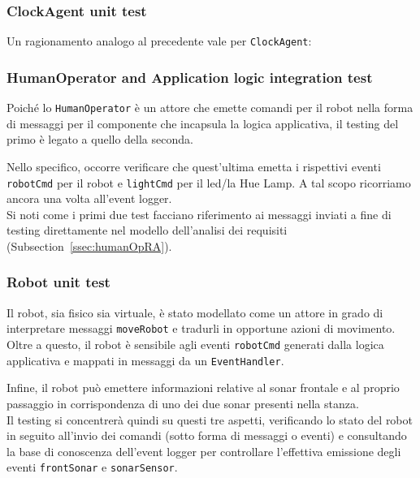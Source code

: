 \documentclass{../llncs}
\newcommand{\codescript}[1]{{\mbox{\small{\texttt{#1}}}}\xspace}
\newcommand{\xss}[1]{\subsectionname~\ref{ssec:#1}}
\newcommand{\subsectionname}{Subsection}
\begin{document}
\subsubsection{ClockAgent unit test}
Un ragionamento analogo al precedente vale per \codescript{ClockAgent}:\\



\subsubsection{HumanOperator and Application logic integration test}
Poiché lo \codescript{HumanOperator} è un attore che emette comandi per il robot nella forma di messaggi per il componente che incapsula la logica applicativa, il testing del primo è legato a quello della seconda.

Nello specifico, occorre verificare che quest'ultima emetta i rispettivi eventi \codescript{robotCmd} per il robot e \codescript{lightCmd} per il led/la Hue Lamp. A tal scopo ricorriamo ancora una volta all'event logger.\\



Si noti come i primi due test facciano riferimento ai messaggi inviati a fine di testing direttamente nel modello dell'analisi dei requisiti (\xss{humanOpRA}).

\subsubsection{Robot unit test}
Il robot, sia fisico sia virtuale, è stato modellato come un attore in grado di interpretare messaggi \codescript{moveRobot} e tradurli in opportune azioni di movimento. Oltre a questo, il robot è sensibile agli eventi \codescript{robotCmd} generati dalla logica applicativa e mappati in messaggi da un \codescript{EventHandler}.

Infine, il robot può emettere informazioni relative al sonar frontale e al proprio passaggio in corrispondenza di uno dei due sonar presenti nella stanza.\\

Il testing si concentrerà quindi su questi tre aspetti, verificando lo stato del robot in seguito all'invio dei comandi (sotto forma di messaggi o eventi) e consultando la base di conoscenza dell'event logger per controllare l'effettiva emissione degli eventi \codescript{frontSonar} e \codescript{sonarSensor}.\\
\end{document}
